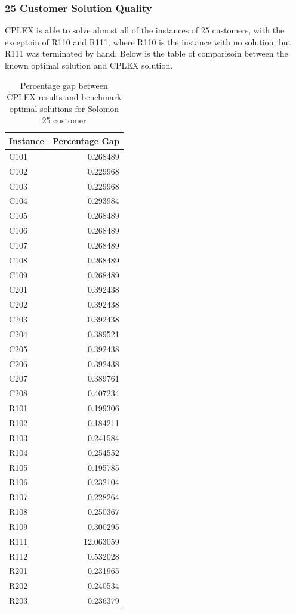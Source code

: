 \documentclass[twocolumn, 10pt]{article}
\begin{document}
\subsubsection*{25 Customer Solution Quality}
CPLEX is able to solve almost all of the instances of 25 customers, with the exceptoin of R110 and R111, where R110 is the instance with no solution, but R111 was terminated by hand. 
Below is the table of comparisoin between the known optimal solution and CPLEX solution.
\begin{table}[H]
\centering
\caption{Percentage gap between CPLEX results and benchmark optimal solutions for Solomon 25 customer}
\label{tab:percentage_gap}
\begin{tabular}{lr}
\toprule
Instance & Percentage Gap \\
\midrule
C101 & 0.268489 \\
C102 & 0.229968 \\
C103 & 0.229968 \\
C104 & 0.293984 \\
C105 & 0.268489 \\
C106 & 0.268489 \\
C107 & 0.268489 \\
C108 & 0.268489 \\
C109 & 0.268489 \\
C201 & 0.392438 \\
C202 & 0.392438 \\
C203 & 0.392438 \\
C204 & 0.389521 \\
C205 & 0.392438 \\
C206 & 0.392438 \\
C207 & 0.389761 \\
C208 & 0.407234 \\
R101 & 0.199306 \\
R102 & 0.184211 \\
R103 & 0.241584 \\
R104 & 0.254552 \\
R105 & 0.195785 \\
R106 & 0.232104 \\
R107 & 0.228264 \\
R108 & 0.250367 \\
R109 & 0.300295 \\
R111 & 12.063059 \\
R112 & 0.532028 \\
R201 & 0.231965 \\
R202 & 0.240534 \\
R203 & 0.236379 \\

\end{tabular}
\end{table}
\end{document}
